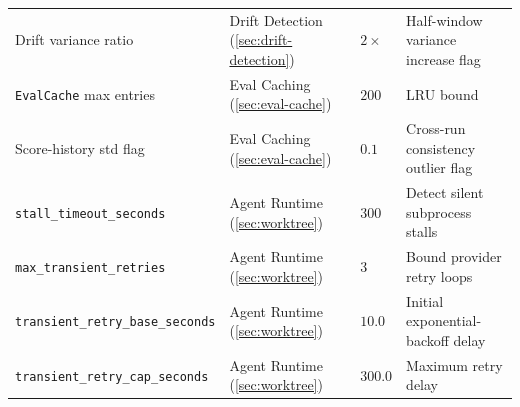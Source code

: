 \begin{table}[t]
\begin{tabular}{@{}p{4.0cm}p{4.0cm}p{2.6cm}p{5.0cm}@{}}
Drift variance ratio                  & Drift Detection (\cref{sec:drift-detection}) & $2\times$ & Half-window variance increase flag \\
\texttt{EvalCache} max entries        & Eval Caching (\cref{sec:eval-cache}) & $200$ & LRU bound \\
Score-history std flag                & Eval Caching (\cref{sec:eval-cache}) & $0.1$ & Cross-run consistency outlier flag \\
\texttt{stall\_timeout\_seconds}      & Agent Runtime (\cref{sec:worktree}) & $300$ & Detect silent subprocess stalls \\
\texttt{max\_transient\_retries}      & Agent Runtime (\cref{sec:worktree}) & $3$ & Bound provider retry loops \\
\texttt{transient\_retry\_base\_seconds} & Agent Runtime (\cref{sec:worktree}) & $10.0$ & Initial exponential-backoff delay \\
\texttt{transient\_retry\_cap\_seconds} & Agent Runtime (\cref{sec:worktree}) & $300.0$ & Maximum retry delay \\
\bottomrule
\end{tabular}
\end{table}

